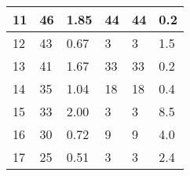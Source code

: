 \begin{table}[H]
\begin{tabular}{|l|l|l|l|l|l|}
\hline
11                  & 46                                                             & 1.85                                                             & 44        & 44                                                                          & 0.2                                                                             \\ 
\hline
12                  & 43                                                             & 0.67                                                             & 3         & 3                                                                           & 1.5                                                                             \\ 
\hline
13                  & 41                                                             & 1.67                                                             & 33        & 33                                                                          & 0.2                                                                             \\ 
\hline
14                  & 35                                                             & 1.04                                                             & 18        & 18                                                                          & 0.4                                                                             \\ 
\hline
15                  & 33                                                             & 2.00                                                             & 3         & 3                                                                           & 8.5                                                                             \\ 
\hline
16                  & 30                                                             & 0.72                                                             & 9         & 9                                                                           & 4.0                                                                             \\ 
\hline
17                  & 25                                                             & 0.51                                                             & 3         & 3                                                                           & 2.4                                                                             \\ 

\end{tabular}
\end{table}
